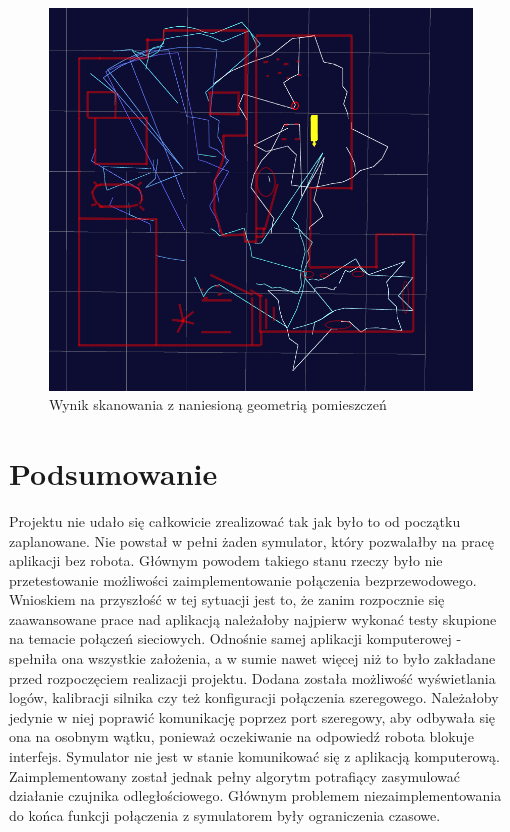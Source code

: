 \documentclass[a4paper,12pt]{article}
\begin{document}
\begin{figure}[p]
\centering
\includegraphics[width=\linewidth]{stancjad.png}
\caption{Wynik skanowania z naniesioną geometrią pomieszczeń}
\label{stancjad}
\end{figure}

\section{Podsumowanie}
Projektu nie udało się całkowicie zrealizować tak jak było to od początku zaplanowane. Nie powstał w pełni żaden symulator, który pozwalałby na pracę aplikacji bez robota. Głównym powodem takiego stanu rzeczy było nie przetestowanie możliwości zaimplementowanie połączenia bezprzewodowego. Wnioskiem na przyszłość w tej sytuacji jest to, że zanim rozpocznie się zaawansowane prace nad aplikacją należałoby najpierw wykonać testy skupione na temacie połączeń sieciowych. \newline
Odnośnie samej aplikacji komputerowej - spełniła ona wszystkie założenia, a w sumie nawet więcej niż to było zakładane przed rozpoczęciem realizacji projektu. Dodana została możliwość wyświetlania logów, kalibracji silnika czy też konfiguracji połączenia szeregowego. Należałoby jedynie w niej poprawić komunikację poprzez port szeregowy, aby odbywała się ona na osobnym wątku, ponieważ oczekiwanie na odpowiedź robota blokuje interfejs. \newline
Symulator nie jest w stanie komunikować się z aplikacją komputerową. Zaimplementowany został jednak pełny algorytm potrafiący zasymulować działanie czujnika odległościowego. \newline
Głównym problemem niezaimplementowania do końca funkcji połączenia z symulatorem były ograniczenia czasowe. 
\end{document}
